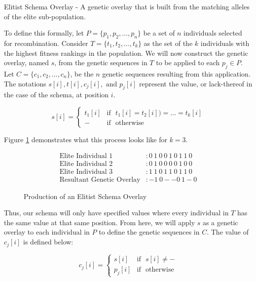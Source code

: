 \begin{overlay}
Elitist Schema Overlay - A genetic overlay that is built from the matching alleles of the elite sub-population.
\end{overlay}

To define this formally, let $P = \{p_1,p_2,\ldots,p_n\}$ be a set of $n$ individuals selected for recombination. Consider $T=\{t_1,t_2,\ldots,t_k\}$ as the set of the $k$ individuals with the highest fitness rankings in the population. We will now construct the genetic overlay, named $s$, from the genetic sequences in $T$ to be applied to each $p_j \in P$. Let $C = \{c_1,c_2,\ldots,c_n\}$, be the $n$ genetic sequences resulting from this application. The notations $s[i], t[i], c_j[i], \text{ and } p_j[i]$ represent the value, or lack-thereof in the case of the schema, at position $i$. 
 
 \begin{displaymath}
   s[i] = \left\{
     \begin{array}{cl}
       t_1[i] & \text{if~ } t_1[i] = t_2[i]) = \ldots = t_k[i] \\
       - & \text{if~ } \text{otherwise} 
     \end{array}
   \right.
\end{displaymath} 

\noindent Figure \ref{ESO-Fig} demonstrates what this process looks like for $k = 3$.

\begin{figure}[h!]
\centering 
\begin{align*}
\text{Elite Individual 1} &: 0~1~0~0~1~0~1~1~0 			\\
\text{Elite Individual 2} &: 0~1~0~0~0~0~1~0~0 			\\
\text{Elite Individual 3} &: 1~1~0~1~1~0~1~1~0 			\\  
\text{Resultant Genetic Overlay} &:   -1~0--0~1-0			
\end{align*}
\caption{Production of an Elitist Schema Overlay}
\label{ESO-Fig}
\end{figure}

Thus, our schema will only have specified values where every individual in $T$ has the same value at that same position. From here, we will apply $s$ as a genetic overlay to each individual in $P$ to define the genetic sequences in $C$. The value of $c_j[i]$ is defined below:

 \begin{displaymath}
   c_j[i] = \left\{
     \begin{array}{cl}
       s[i] & \text{if~ } s[i] \not= - \\
       p_j[i] & \text{if~ } \text{otherwise} 
     \end{array}
   \right.
\end{displaymath} 

